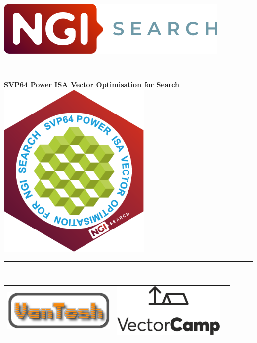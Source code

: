 \documentclass[a4paper,12pt]{book}
\begin{document}

\setlength{\parindent}{0em}
\setlength{\parskip}{0em}

\begin{titlepage}
	\begin{center}
	\includegraphics[width=0.5\linewidth]{images/ngisearch-logo.png}\\
	\vspace*{10mm}
	\noindent\rule{\textwidth}{2pt}\\
	\Large{\textbf{SVP64 Power ISA Vector Optimisation for Search}}\\
	\includegraphics[width=75mm]{images/svp64-logo.png}\\
	\noindent\rule{\textwidth}{2pt}\\
	\vspace*{10mm}
	\begin{tabular}{ccc}
		\includegraphics[width=55mm]{images/vantosh-logo.png}				&
		\includegraphics[width=55mm]{images/vectorcamp-logo.png}			&

\end{tabular}
\end{center}
\end{titlepage}
\end{document}
